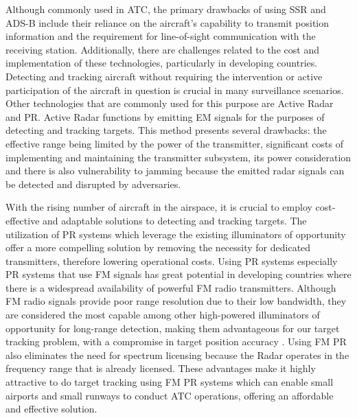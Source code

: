 Although commonly used in \ac{ATC}, the primary drawbacks of using \ac{SSR} and \ac{ADS-B} include their reliance on the aircraft's capability to transmit position information and the requirement for line-of-sight communication with the receiving station. Additionally, there are challenges related to the cost and implementation of these technologies, particularly in developing countries. Detecting and tracking aircraft without requiring the intervention or active participation of the aircraft in question is crucial in many surveillance scenarios. Other technologies that are commonly used for this purpose are Active \ac{Radar} and \ac{PR}. Active \ac{Radar} functions by emitting \ac{EM} signals for the purposes of detecting and tracking targets. This method presents several drawbacks: the effective range being limited by the power of the transmitter, significant costs of implementing and maintaining the transmitter subsystem, its power consideration and there is also vulnerability to jamming because the emitted radar signals can be detected and disrupted by adversaries.

With the rising number of aircraft in the airspace, it is crucial to employ cost-effective and adaptable solutions to detecting and tracking targets. The utilization of \ac{PR} systems which leverage the existing illuminators of opportunity offer a more compelling solution by removing the necessity for dedicated transmitters, therefore lowering operational costs. Using \ac{PR} systems especially \ac{PR} systems that use \ac{FM} signals has great potential in developing countries where there is a widespread availability of powerful \ac{FM} radio transmitters. Although \ac{FM} radio signals provide poor range resolution due to their low bandwidth, they are considered the most capable among other high-powered illuminators of opportunity for long-range detection, making them advantageous for our target tracking problem, with a compromise in target position accuracy \cite{De2015}. Using \ac{FM} \ac{PR} also eliminates the need for spectrum licensing because the \ac{Radar} operates in the frequency range that is already licensed. These advantages make it highly attractive to do target tracking using \ac{FM} \ac{PR} systems which can enable small airports and small runways to conduct \ac{ATC} operations, offering an affordable and effective solution. 

